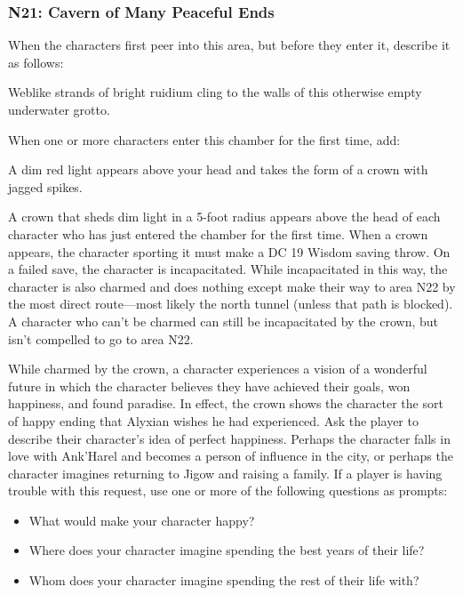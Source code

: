 \documentclass[10pt,a4paper,twoside,twocolumn,openany,nodeprecatedcode]{dndbook}
\begin{document}
\subsubsection{N21: Cavern of Many Peaceful Ends}
When the characters first peer into this area, but before they enter it, describe it as follows:

\begin{DndReadAloud}{}
Weblike strands of bright ruidium cling to the walls of this otherwise empty underwater grotto.

\end{DndReadAloud}

When one or more characters enter this chamber for the first time, add:

\begin{DndReadAloud}{}
A dim red light appears above your head and takes the form of a crown with jagged spikes.

\end{DndReadAloud}

A crown that sheds dim light in a 5-foot radius appears above the head of each character who has just entered the chamber for the first time. When a crown appears, the character sporting it must make a DC 19 Wisdom saving throw. On a failed save, the character is incapacitated. While incapacitated in this way, the character is also charmed and does nothing except make their way to area N22 by the most direct route—most likely the north tunnel (unless that path is blocked). A character who can't be charmed can still be incapacitated by the crown, but isn't compelled to go to area N22.

While charmed by the crown, a character experiences a vision of a wonderful future in which the character believes they have achieved their goals, won happiness, and found paradise. In effect, the crown shows the character the sort of happy ending that Alyxian wishes he had experienced. Ask the player to describe their character's idea of perfect happiness. Perhaps the character falls in love with Ank'Harel and becomes a person of influence in the city, or perhaps the character imagines returning to Jigow and raising a family. If a player is having trouble with this request, use one or more of the following questions as prompts:


\begin{itemize}
\item What would make your character happy?
\item Where does your character imagine spending the best years of their life?
\item Whom does your character imagine spending the rest of their life with?
\end{itemize}
\end{document}
